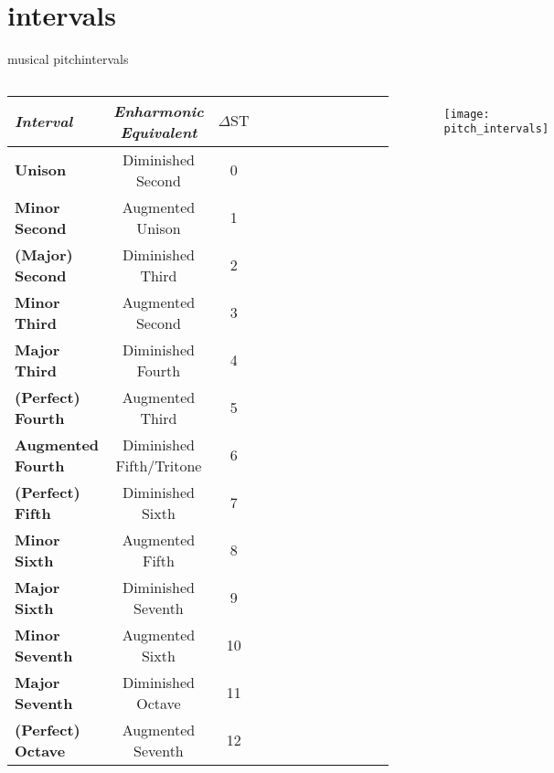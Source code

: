     \section{intervals}
        \begin{frame}{musical pitch}{intervals}
            \vspace{-8mm}
            \begin{columns}
            \begin{scriptsize}
                \begin{table}
                    \centering
                    \begin{tabular}{lccccccccccc} %
                        \\ \hline
                        \bf{\emph{Interval}}	 & \bf{\emph{Enharmonic Equivalent}}	 & \bf{\emph{$\Delta\mathrm{ST}$}}\\ 
                         \hline
                        \bf{Unison}	 & Diminished Second	 & 0\\
                        \bf{Minor Second}	 & Augmented Unison	 & 1\\
                        \bf{(Major) Second}	 & Diminished Third	 & 2\\
                        \bf{Minor Third}	 & Augmented Second	 & 3\\
                        \bf{Major Third}	 & Diminished Fourth	 & 4\\
                        \bf{(Perfect) Fourth}	 & Augmented Third	 & 5\\
                        \bf{Augmented Fourth}	 & Diminished Fifth/Tritone	 & 6\\
                        \bf{(Perfect) Fifth}	 & Diminished Sixth	 & 7\\
                        \bf{Minor Sixth}	 & Augmented Fifth	 & 8\\
                        \bf{Major Sixth}	 & Diminished Seventh	 & 9\\
                        \bf{Minor Seventh}	 & Augmented Sixth	 & 10\\
                        \bf{Major Seventh}	 & Diminished Octave	 & 11\\
                        \bf{(Perfect) Octave}	 & Augmented Seventh	 & 12\\
                    \end{tabular}
                \end{table}
            \end{scriptsize}
            \begin{figure}
                \texttt{[image: pitch\_intervals]}
            \end{figure}
            \end{columns}
        \end{frame}

